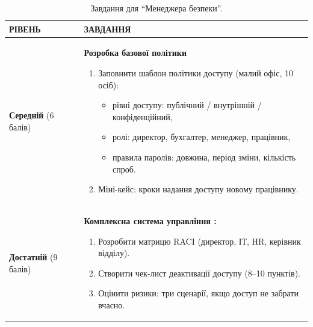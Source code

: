 \begin{table}[h!]
\caption{Завдання для ``Менеджера безпеки''.}
\label{tab:lesson4_manag_task} %
\noindent %

\begin{tabular}{
  | >{\raggedright\arraybackslash}p{} 
  | >{\raggedright\arraybackslash}p{} |
}
\hline

\rowcolor{TableHeaderBrown}
\hfil \color{white}\textbf{РІВЕНЬ} & 
\hfil \color{white}\textbf{ЗАВДАННЯ} \\ \hline

\cellcolor{TableBodyPeach}
\textbf{Середній} (6 балів) &
\textbf{Розробка базової політики}
\begin{enumerate}
    \item Заповнити шаблон політики доступу (малий офіс, 10 осіб):
    \begin{itemize}
        \item рівні доступу: публічний / внутрішній / конфіденційний, \vspace{-0.5em}
        \item ролі: директор, бухгалтер, менеджер, працівник,\vspace{-0.5em}
        \item правила паролів: довжина, період зміни, кількість спроб.
    \end{itemize}
    \item Міні-кейс: кроки надання доступу новому працівнику.
\end{enumerate} \\ \hline

\cellcolor{TableBodyPeach}
\textbf{Достатній} (9 балів) &
\textbf{Комплексна система управління :}
\begin{enumerate}
    \item Розробити матрицю RACI (директор, ІТ, HR, керівник відділу).
    \item Створити чек-лист деактивації доступу (8--10 пунктів).
    \item Оцінити ризики: три сценарії, якщо доступ не забрати вчасно.
\end{enumerate} \\ \hline


\end{tabular}
\end{table}
